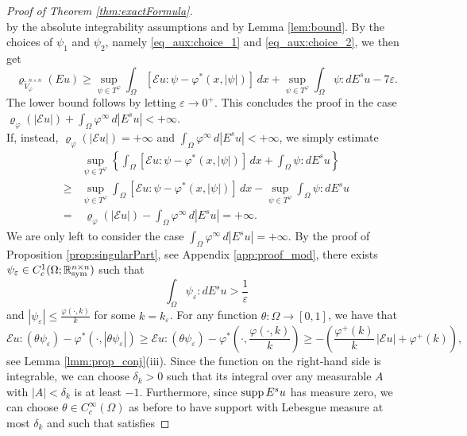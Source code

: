 \documentclass[a4paper,11pt,oneside,notitlepage]{article}
\numberwithin{equation}{section}
\def\R{\mathbb{R}}
\def\sym{{\rm sym}}
\def\supp{{\rm supp}}
\newcommand{\e}{\varepsilon}
\newcommand{\vphi}{\varphi}
\newcommand{\vrho}{\varrho}
\newcommand{\E}{\mathcal{E}}
\begin{document}
\begin{proof}[Proof of Theorem \ref{thm:exactFormula}]
\begin{equation*}
    \end{equation*}
    by the absolute integrability assumptions and by Lemma \ref{lem:bound}. By the choices of $\psi_1$ and $\psi_2$, namely \eqref{eq_aux:choice_1} and \eqref{eq_aux:choice_2}, we then get
    \begin{equation*}
        \vrho_{\widetilde{V}^{n \times n}_\vphi}(Eu) \ge \sup_{\psi \in T^\vphi} \int_\Omega [\E u : \psi - \vphi^*(x, |\psi|)] \, dx + \sup_{\psi \in T^\vphi} \int_\Omega \psi : dE^su - 7 \e.
    \end{equation*}
    The lower bound follows by letting $\e \to 0^+$. This concludes the proof in the case $\vrho_\vphi(|\E u|) + \int_\Omega \vphi^\infty \, d|E^su| < +\infty$.
    \\
    If, instead, $\vrho_\vphi(|\E u|) = +\infty$ and $\int_\Omega \vphi^\infty \, d|E^su| < +\infty$, we simply estimate
    \begin{equation*}
    \begin{aligned}
        &\sup_{\psi \in T^\vphi} \left\{ \int_\Omega [\E u : \psi - \vphi^*(x, |\psi|)] \, dx + \int_\Omega \psi : dE^su \right\} \\
        \ge &\sup_{\psi \in T^\vphi} \int_\Omega [\E u : \psi - \vphi^*(x, |\psi|)] \, dx - \sup_{\psi \in T^\vphi} \int_\Omega \psi : dE^su \\
        = & \ \vrho_\vphi(|\E u|) - \int_\Omega \vphi^\infty \, d|E^su| = +\infty. 
    \end{aligned}
    \end{equation*}
    We are only left to consider the case $\int_\Omega \vphi^\infty \, d|E^su| = +\infty$. By the proof of Proposition \ref{prop:singularPart}, see Appendix \ref{app:proof_mod}, there exists $\psi_\e \in C^1_c(\Omega; \R^{n \times n}_\sym)$ such that
    \begin{equation*}
        \int_\Omega \psi_\e : dE^su > \frac{1}{\e}
    \end{equation*}
    and $|\psi_\e| \le \frac{\vphi(\cdot, k)}{k}$ for some $k = k_\e$. For any function $\theta : \Omega \to [0,1]$, we have that 
    \begin{equation*}
        \E u : (\theta \psi_\e) - \vphi^*(\cdot, |\theta \psi_\e|) \ge \E u : (\theta \psi_\e) - \vphi^* \left(\cdot, \frac{\vphi(\cdot, k)}{k} \right) \ge - \left(\frac{\vphi^+(k)}{k} \, |\E u| + \vphi^+(k) \right),
    \end{equation*}
    see Lemma \ref{lmm:prop_conj}(iii). Since the function on the right-hand side is integrable, we can choose $\delta_k > 0$ such that its integral over any measurable $A$ with $|A| < \delta_k$ is at least $-1$. Furthermore, since $\supp \, E^su$ has measure zero, we can choose $\theta \in C^\infty_c(\Omega)$ as before to have support with Lebesgue measure at most $\delta_k$ and such that satisfies

\end{proof}
\end{document}
